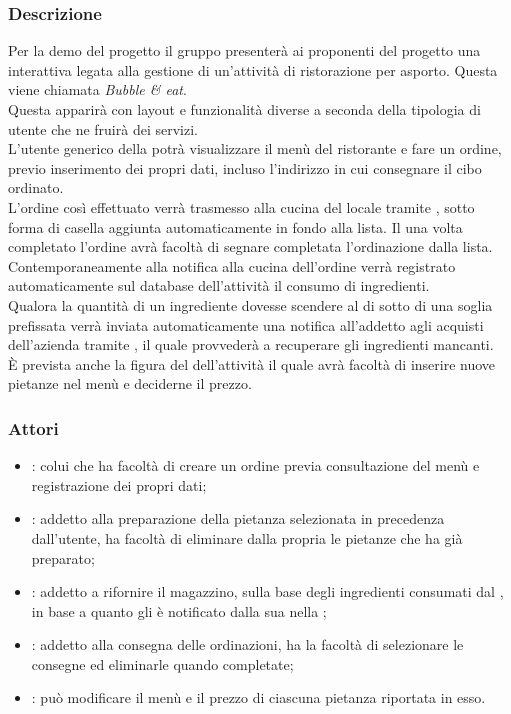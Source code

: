 \subsubsection{Descrizione}
Per la demo del progetto il gruppo \GroupName{} presenterà ai proponenti del progetto una  interattiva legata alla gestione di un'attività di ristorazione per asporto. Questa  viene chiamata \textit{Bubble \& eat}.
\\Questa {} apparirà con layout e funzionalità diverse a seconda della tipologia di utente che ne fruirà dei servizi.
\\L'utente generico della  potrà visualizzare il menù del ristorante e fare un ordine, previo inserimento dei propri dati, incluso l'indirizzo in cui consegnare il cibo ordinato.
\\L'ordine così effettuato verrà trasmesso alla cucina del locale tramite  , sotto forma di casella aggiunta automaticamente in fondo alla lista. Il  una volta completato l'ordine avrà facoltà di segnare completata l'ordinazione dalla lista.
\\Contemporaneamente alla notifica alla cucina dell'ordine verrà registrato automaticamente sul database dell'attività il consumo di ingredienti.
\\Qualora la quantità di un ingrediente dovesse scendere al di sotto di una soglia prefissata verrà inviata automaticamente una notifica all'addetto agli acquisti dell'azienda tramite , il quale provvederà a recuperare gli ingredienti mancanti.
\\È prevista anche la figura del  dell'attività il quale avrà facoltà di inserire nuove pietanze nel menù e deciderne il prezzo.

\subsubsection{Attori}
\begin{itemize}
	\item {}: colui che ha facoltà di creare un ordine previa consultazione del menù e registrazione dei propri dati;
	\item {}: addetto alla preparazione della pietanza selezionata in precedenza dall'utente, ha facoltà di eliminare dalla propria  le pietanze che ha già preparato;
	\item {}: addetto a rifornire il magazzino, sulla base degli ingredienti consumati dal , in base a quanto gli è notificato dalla sua  nella ;
	\item {}: addetto alla consegna delle ordinazioni, ha la facoltà di selezionare le consegne ed eliminarle quando completate;
	\item {}: può modificare il menù e il prezzo di ciascuna pietanza riportata in esso.
\end{itemize}

